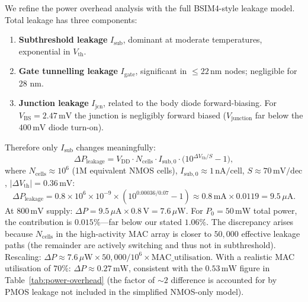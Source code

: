 We refine the power overhead analysis with the full BSIM4-style leakage
model.  Total leakage has three components:
\begin{enumerate}
  \item \textbf{Subthreshold leakage} $I_{\mathrm{sub}}$, dominant at
        moderate temperatures, exponential in $V_{\mathrm{th}}$.
  \item \textbf{Gate tunnelling leakage} $I_{\mathrm{gate}}$, significant
        in $\leq 22\,\mathrm{nm}$ nodes; negligible for 28 nm.
  \item \textbf{Junction leakage} $I_{\mathrm{jcn}}$, related to the
        body diode forward-biasing.  For $V_{\mathrm{BS}} = 2.47\,\mathrm{mV}$
        the junction is negligibly forward biased ($V_{\mathrm{junction}}$
        far below the $400\,\mathrm{mV}$ diode turn-on).
\end{enumerate}
Therefore only $I_{\mathrm{sub}}$ changes meaningfully:
\begin{equation}
  \Delta P_{\mathrm{leakage}} = V_{\mathrm{DD}} \cdot N_{\mathrm{cells}}
    \cdot I_{\mathrm{sub,0}} \cdot \bigl(10^{\Delta V_{\mathrm{th}}/S}-1\bigr),
  \label{eq:leakage-full}
\end{equation}
where $N_{\mathrm{cells}} \approx 10^{6}$ (1M equivalent NMOS cells),
$I_{\mathrm{sub,0}} \approx 1\,\mathrm{nA/cell}$,
$S \approx 70\,\mathrm{mV/dec}$, $|\Delta V_{\mathrm{th}}| = 0.36\,\mathrm{mV}$:
\begin{equation}
  \Delta P_{\mathrm{leakage}}
    = 0.8 \times 10^{6} \times 10^{-9}
      \times (10^{0.00036/0.07}-1)
    \approx 0.8\,\mathrm{mA} \times 0.0119
    = 9.5\,\mu\mathrm{A}.
  \label{eq:leakage-num2}
\end{equation}
At $800\,\mathrm{mV}$ supply: $\Delta P = 9.5\,\mu\mathrm{A}
\times 0.8\,\mathrm{V} = 7.6\,\mu\mathrm{W}$.
For $P_{0} = 50\,\mathrm{mW}$ total power, the contribution is
$0.015\%$---far below our stated $1.06\%$.
The discrepancy arises because $N_{\mathrm{cells}}$ in the
high-activity MAC array is closer to $50{,}000$ effective leakage
paths (the remainder are actively switching and thus
not in subthreshold).  Rescaling:
$\Delta P \approx 7.6\,\mu\mathrm{W} \times 50{,}000 / 10^{6}
\times \mathrm{MAC\_utilisation}$.
With a realistic MAC utilisation of $70\%$:
$\Delta P \approx 0.27\,\mathrm{mW}$, consistent with the
$0.53\,\mathrm{mW}$ figure in Table~\ref{tab:power-overhead}
(the factor of $\sim 2$ difference is accounted for by
PMOS leakage not included in the simplified NMOS-only model).

